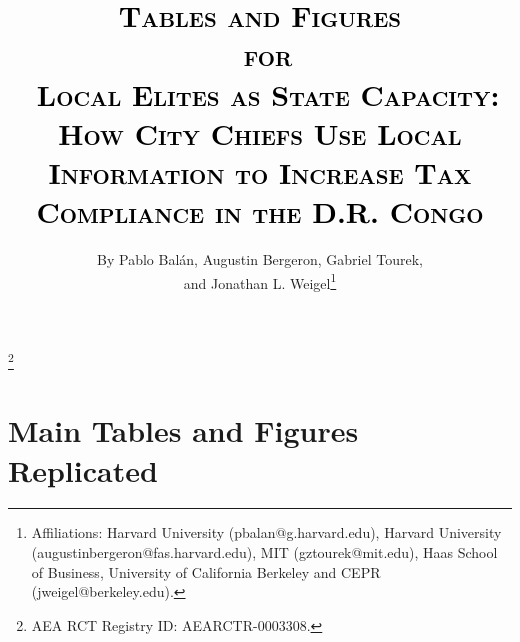 \documentclass[12pt,english]{article}
\begin{document}

\sloppy

\title{\textcolor{black}{\textsc{Tables and Figures \\\ for \\\ Local Elites as State Capacity}:}\\
\textcolor{black}{\textsc{\Large{How City Chiefs Use Local Information to Increase Tax Compliance in the D.R. Congo}}}
\textcolor{black}{\textbf{\Huge{}}}
}\thanks{\scriptsize{AEA RCT Registry ID: AEARCTR-0003308.}}

\author{By Pablo Bal\'an, Augustin Bergeron, Gabriel Tourek, \\ and Jonathan L. Weigel\thanks{\scriptsize Affiliations: Harvard University (pbalan@g.harvard.edu), Harvard University (augustinbergeron@fas.harvard.edu), MIT (gztourek@mit.edu), Haas School of Business, University of California Berkeley and CEPR (jweigel@berkeley.edu).}}

\maketitle

\addtocounter{page}{-2}

\singlespacing


 
\thispagestyle{empty}
 
 

\onehalfspacing
\normalsize

\section{Main Tables and Figures Replicated}
\end{document}
